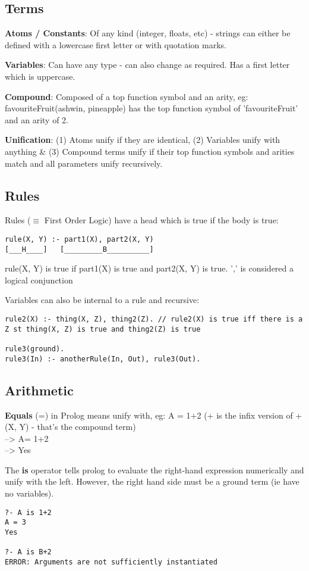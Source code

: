 \documentclass{article}
\begin{document}
\subsection{Terms}
\textbf{Atoms / Constants}: Of any kind (integer, floats, etc) - strings can either be defined with a lowercase first letter or with quotation marks.

\textbf{Variables}: Can have any type - can also change as required. Has a first letter which is uppercase.

\textbf{Compound}: Composed of a top function symbol and an arity, eg: favouriteFruit(ashwin, pineapple) has the top function symbol of 'favouriteFruit' and an arity of 2.

\bigskip
\textbf{Unification}: (1) Atoms unify if they are identical, (2) Variables unify with anything \&{}  (3) Compound terms unify if their top function symbols and arities match and all parameters unify recursively.

\subsection{Rules}
Rules ($\equiv$ First Order Logic) have a head which is true if the body is true:
\begin{lstlisting}
rule(X, Y) :- part1(X), part2(X, Y)
[___H____]   [_________B__________]
\end{lstlisting}

rule(X, Y) is true if part1(X) is true and part2(X, Y) is true. ',' is considered a logical conjunction

\bigskip
Variables can also be internal to a rule and recursive:
\begin{lstlisting}
rule2(X) :- thing(X, Z), thing2(Z). // rule2(X) is true iff there is a Z st thing(X, Z) is true and thing2(Z) is true

rule3(ground).
rule3(In) :- anotherRule(In, Out), rule3(Out).
\end{lstlisting}
\subsection{Arithmetic}
\textbf{Equals} (=) in Prolog means unify with, eg: A = 1+2 (+ is the infix version of +(X, Y) - that's the compound term)\\
--> A= 1+2\\
--> Yes

The \textbf{is} operator tells prolog to evaluate the right-hand expression numerically and unify with the left. However, the right hand side must be a ground term (ie have no variables).
\begin{lstlisting}
?- A is 1+2
A = 3
Yes

?- A is B+2
ERROR: Arguments are not sufficiently instantiated
\end{lstlisting}
\end{document}
